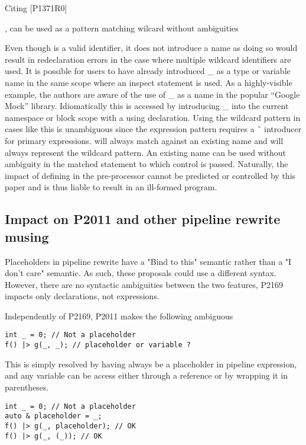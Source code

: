 \documentclass{wg21}
\begin{document}
Citing [P1371R0]{\cite{P1371R0}, \tcode{_} can be used as a pattern matching wilcard without ambiguities

\begin{quoteblock}
Even though \tcode{_} is a valid identifier, it does not introduce a name as doing so would result in redeclaration
errors in the case where multiple wildcard \tcode{_} identifiers are used.
It is possible for users to have already introduced _ as a type or variable name in the same scope where an
inspect statement is used. As a highly-visible example, the authors are aware of the use of _ as a name in
the popular “Google Mock” library. Idiomatically this is accessed by introducing _ into the current namespace
or block scope with a using declaration. Using the wildcard pattern in cases like this is unambiguous since
the expression pattern requires a ˆ introducer for primary expressions. \tcode{\^_} will always match against an
existing name and \tcode{_} will always represent the wildcard pattern. An existing \tcode{_} name can be used without
ambiguity in the matched statement to which control is passed.
Naturally, the impact of defining \tcode{_} in the pre-processor cannot be predicted or controlled by this paper and
is thus liable to result in an ill-formed program.
\end{quoteblock}

\subsection{Impact on P2011 and other pipeline rewrite musing}

Placeholders in pipeline rewrite have a "Bind to this" semantic rather than a "I don't care" semantic.
As such, these proposals could use a different syntax.
However, there are no syntactic ambiguities between the two features, P2169 impacts only declarations, not expressions.

Independently of P2169, P2011 makes the following ambiguous

\begin{lstlisting}[style=color]
int _ = 0; // Not a placeholder
f() |> g(_, _); // placeholder or variable ?
\end{lstlisting}

This is simply resolved by having \tcode{_} always be a placeholder in pipeline expression,
and any \tcode{_} variable can be access either through a reference or by wrapping it in parentheses.

\begin{lstlisting}[style=color]
int _ = 0; // Not a placeholder
auto & placeholder = _;
f() |> g(_, placeholder); // OK
f() |> g(_, (_)); // OK
\end{lstlisting}


}
\end{document}
